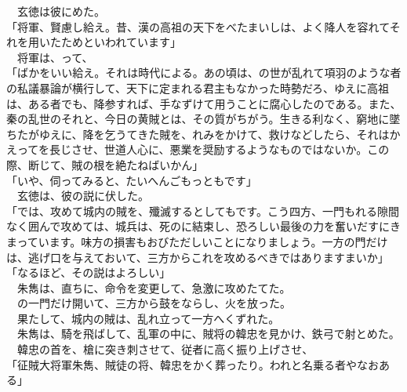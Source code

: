 \documentclass[
  paper=a5,
  fontsize=10pt,
  jafontsize=9.5pt,
  tate,                  %
  open_bracket_pos=nibu, %
]{jlreq}
\begin{document}
　玄徳は彼にめた。\\


「将軍、賢慮し給え。昔、漢の高祖の天下をべたまいしは、よく降人を容れてそれを用いたためといわれています」\\


　将軍は、って、\\


「ばかをいい給え。それは時代による。あの頃は、の世が乱れて項羽のような者の私議暴論が横行して、天下に定まれる君主もなかった時勢だろ、ゆえに高祖は、ある者でも、降参すれば、手なずけて用うことに腐心したのである。また、秦の乱世のそれと、今日の黄賊とは、その質がちがう。生きる利なく、窮地に墜ちたがゆえに、降を乞うてきた賊を、れみをかけて、救けなどしたら、それはかえってを長じさせ、世道人心に、悪業を奨励するようなものではないか。この際、断じて、賊の根を絶たねばいかん」\\


「いや、伺ってみると、たいへんごもっともです」\\


　玄徳は、彼の説に伏した。\\


「では、攻めて城内の賊を、殲滅するとしてもです。こう四方、一門もれる隙間なく囲んで攻めては、城兵は、死のに結束し、恐ろしい最後の力を奮いだすにきまっています。味方の損害もおびただしいことになりましょう。一方の門だけは、逃げ口を与えておいて、三方からこれを攻めるべきではありますまいか」\\


「なるほど、その説はよろしい」\\


　朱雋は、直ちに、命令を変更して、急激に攻めたてた。\\


　の一門だけ開いて、三方から鼓をならし、火を放った。\\


　果たして、城内の賊は、乱れ立って一方へくずれた。\\


　朱雋は、騎を飛ばして、乱軍の中に、賊将の韓忠を見かけ、鉄弓で射とめた。\\


　韓忠の首を、槍に突き刺させて、従者に高く振り上げさせ、\\


「征賊大将軍朱雋、賊徒の将、韓忠をかく葬ったり。われと名乗る者やなおある」\\
\end{document}
